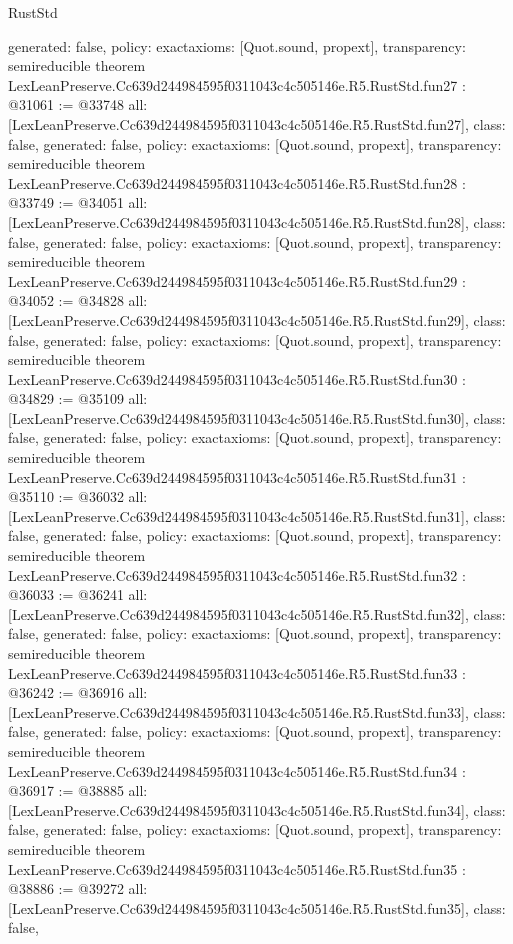\begin{lexlean}{RustStd}
\begin{coremodule}
{  generated: false,
  policy: exact{axioms: [Quot.sound, propext]},
  transparency: semireducible
}
theorem LexLeanPreserve.Cc639d244984595f0311043c4c505146e.R5.RustStd.fun27 : @31061 := @33748 {
  all: [LexLeanPreserve.Cc639d244984595f0311043c4c505146e.R5.RustStd.fun27],
  class: false,
  generated: false,
  policy: exact{axioms: [Quot.sound, propext]},
  transparency: semireducible
}
theorem LexLeanPreserve.Cc639d244984595f0311043c4c505146e.R5.RustStd.fun28 : @33749 := @34051 {
  all: [LexLeanPreserve.Cc639d244984595f0311043c4c505146e.R5.RustStd.fun28],
  class: false,
  generated: false,
  policy: exact{axioms: [Quot.sound, propext]},
  transparency: semireducible
}
theorem LexLeanPreserve.Cc639d244984595f0311043c4c505146e.R5.RustStd.fun29 : @34052 := @34828 {
  all: [LexLeanPreserve.Cc639d244984595f0311043c4c505146e.R5.RustStd.fun29],
  class: false,
  generated: false,
  policy: exact{axioms: [Quot.sound, propext]},
  transparency: semireducible
}
theorem LexLeanPreserve.Cc639d244984595f0311043c4c505146e.R5.RustStd.fun30 : @34829 := @35109 {
  all: [LexLeanPreserve.Cc639d244984595f0311043c4c505146e.R5.RustStd.fun30],
  class: false,
  generated: false,
  policy: exact{axioms: [Quot.sound, propext]},
  transparency: semireducible
}
theorem LexLeanPreserve.Cc639d244984595f0311043c4c505146e.R5.RustStd.fun31 : @35110 := @36032 {
  all: [LexLeanPreserve.Cc639d244984595f0311043c4c505146e.R5.RustStd.fun31],
  class: false,
  generated: false,
  policy: exact{axioms: [Quot.sound, propext]},
  transparency: semireducible
}
theorem LexLeanPreserve.Cc639d244984595f0311043c4c505146e.R5.RustStd.fun32 : @36033 := @36241 {
  all: [LexLeanPreserve.Cc639d244984595f0311043c4c505146e.R5.RustStd.fun32],
  class: false,
  generated: false,
  policy: exact{axioms: [Quot.sound, propext]},
  transparency: semireducible
}
theorem LexLeanPreserve.Cc639d244984595f0311043c4c505146e.R5.RustStd.fun33 : @36242 := @36916 {
  all: [LexLeanPreserve.Cc639d244984595f0311043c4c505146e.R5.RustStd.fun33],
  class: false,
  generated: false,
  policy: exact{axioms: [Quot.sound, propext]},
  transparency: semireducible
}
theorem LexLeanPreserve.Cc639d244984595f0311043c4c505146e.R5.RustStd.fun34 : @36917 := @38885 {
  all: [LexLeanPreserve.Cc639d244984595f0311043c4c505146e.R5.RustStd.fun34],
  class: false,
  generated: false,
  policy: exact{axioms: [Quot.sound, propext]},
  transparency: semireducible
}
theorem LexLeanPreserve.Cc639d244984595f0311043c4c505146e.R5.RustStd.fun35 : @38886 := @39272 {
  all: [LexLeanPreserve.Cc639d244984595f0311043c4c505146e.R5.RustStd.fun35],
  class: false,
}
\end{coremodule}
\end{lexlean}
